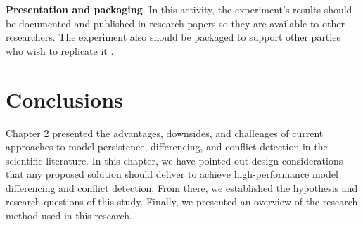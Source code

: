 \textbf{Presentation and packaging}. In this activity, the experiment’s results should be documented and published in research papers so they are available to other researchers. The experiment also should be packaged to support other parties who wish to replicate it \cite{DBLP:books/daglib/0029933/Wohlin}.

\section{Conclusions}
\label{sec:conclusions_2b}
Chapter 2 presented the advantages, downsides, and challenges of current approaches to model persistence, differencing, and conflict detection in the scientific literature. In this chapter, we have pointed out design considerations that any proposed solution should deliver to achieve high-performance model differencing and conflict detection. From there, we established the hypothesis and research questions of this study. Finally, we presented an overview of the research method used in this research.

